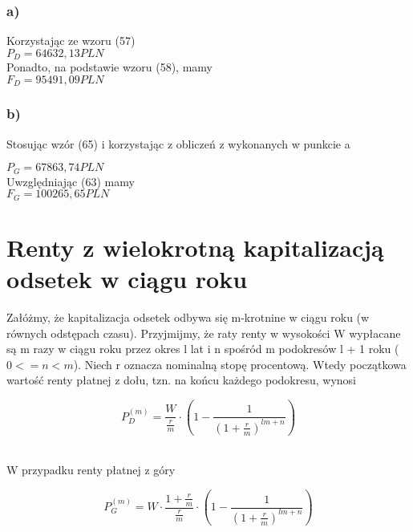 \documentclass{article}
\begin{document}
\subsubsection{a)}

Korzystając ze wzoru (57)\\

$ P_D = 64 632,13 PLN $\\

Ponadto, na podstawie wzoru (58), mamy\\

$ F_D = 95 491,09 PLN $\\

\subsubsection{b)}

Stosując wzór (65) i korzystając z obliczeń z wykonanych w punkcie a

$ P_G = 67863,74 PLN $\\

Uwzględniając (63) mamy\\

$ F_G = 100 265,65 PLN $\\

\newpage

\section{Renty z wielokrotną kapitalizacją odsetek w ciągu roku}

Załóżmy, że kapitalizacja odsetek odbywa się m-krotnine w ciągu roku (w równych odstępach czasu). Przyjmijmy, że raty renty w wysokości W wypłacane są m razy w ciągu roku przez okres l lat i n spośród m podokresów l + 1 roku ($ 0 <= n < m $). Niech r oznacza nominalną stopę procentową. Wtedy początkowa wartość renty płatnej z dołu, tzn. na końcu każdego podokresu, wynosi

\begin{center}
	\begin{equation}
		P^{(m)}_D = \frac{W}{\frac{r}{m}} \cdot (1 - \frac{1}{(1 + \frac{r}{m})^{lm + n}}) 
	\end{equation}
\end{center}\\

W przypadku renty płatnej z góry

\begin{center}
	\begin{equation}
		P^{(m)}_G = W \cdot \frac{1 + \frac{r}{m}}{\frac{r}{m}} \cdot (1 - \frac{1}{(1 + \frac{r}{m})^{lm + n}}) 
	\end{equation}
\end{center}\\
\end{document}
